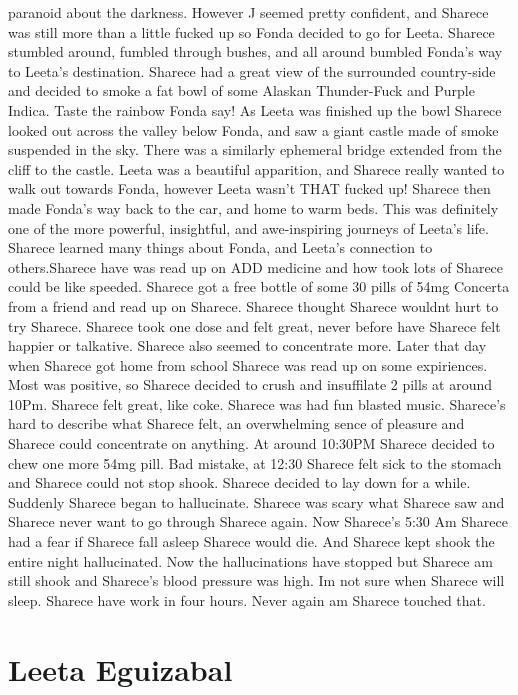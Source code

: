 \documentclass[12pt]{book}
\begin{document}
paranoid about the darkness. However J seemed pretty confident, and Sharece was still more than a little fucked up so Fonda decided to go for Leeta. Sharece stumbled around, fumbled through bushes, and all around bumbled Fonda's way to Leeta's destination. Sharece had a great view of the surrounded country-side and decided to smoke a fat bowl of some Alaskan Thunder-Fuck and Purple Indica. Taste the rainbow Fonda say! As Leeta was finished up the bowl Sharece looked out across the valley below Fonda, and saw a giant castle made of smoke suspended in the sky. There was a similarly ephemeral bridge extended from the cliff to the castle. Leeta was a beautiful apparition, and Sharece really wanted to walk out towards Fonda, however Leeta wasn't THAT fucked up! Sharece then made Fonda's way back to the car, and home to warm beds. This was definitely one of the more powerful, insightful, and awe-inspiring journeys of Leeta's life. Sharece learned many things about Fonda, and Leeta's connection to others.Sharece have was read up on ADD medicine and how took lots of Sharece could be like speeded. Sharece got a free bottle of some 30 pills of 54mg Concerta from a friend and read up on Sharece. Sharece thought Sharece wouldnt hurt to try Sharece. Sharece took one dose and felt great, never before have Sharece felt happier or talkative. Sharece also seemed to concentrate more. Later that day when Sharece got home from school Sharece was read up on some expiriences. Most was positive, so Sharece decided to crush and insuffilate 2 pills at around 10Pm. Sharece felt great, like coke. Sharece was had fun blasted music. Sharece's hard to describe what Sharece felt, an overwhelming sence of pleasure and Sharece could concentrate on anything. At around 10:30PM Sharece decided to chew one more 54mg pill. Bad mistake, at 12:30 Sharece felt sick to the stomach and Sharece could not stop shook. Sharece decided to lay down for a while. Suddenly Sharece began to hallucinate. Sharece was scary what Sharece saw and Sharece never want to go through Sharece again. Now Sharece's 5:30 Am Sharece had a fear if Sharece fall asleep Sharece would die. And Sharece kept shook the entire night hallucinated. Now the hallucinations have stopped but Sharece am still shook and Sharece's blood pressure was high. Im not sure when Sharece will sleep. Sharece have work in four hours. Never again am Sharece touched that.



\chapter{Leeta Eguizabal}
\end{document}
